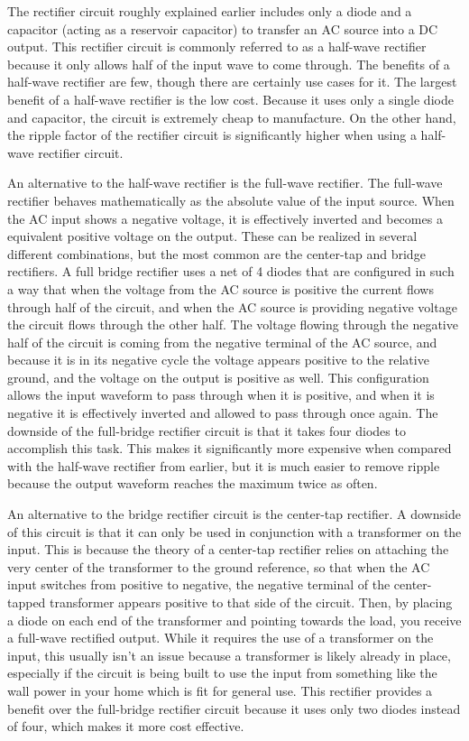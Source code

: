 
The rectifier circuit roughly explained earlier includes
only a diode and a capacitor (acting as a reservoir
capacitor) to transfer an AC source into a DC output.
This rectifier circuit is commonly referred to as a
half-wave rectifier because it only allows half of the
input wave to come through. The benefits of a half-wave
rectifier are few, though there are certainly use cases
for it. The largest benefit of a half-wave rectifier
is the low cost. Because it uses only a single diode
and capacitor, the circuit is extremely cheap to manufacture.
On the other hand, the ripple factor of the rectifier
circuit is significantly higher when using a half-wave
rectifier circuit.

An alternative to the half-wave rectifier is the full-wave
rectifier. The full-wave rectifier behaves mathematically
as the absolute value of the input source. When the
AC input shows a negative voltage, it is effectively
inverted and becomes a equivalent positive voltage on
the output. These can be realized in several different
combinations, but the most common are the center-tap
and bridge rectifiers. A full bridge rectifier uses
a net of 4 diodes that are configured in such a way
that when the voltage from the AC source is positive
the current flows through half of the circuit, and when
the AC source is providing negative voltage the circuit
flows through the other half. The voltage flowing through
the negative half of the circuit is coming from the
negative terminal of the AC source, and because it is
in its negative cycle the voltage appears positive to
the relative ground, and the voltage on the output is
positive as well. This configuration allows the input
waveform to pass through when it is positive, and when
it is negative it is effectively inverted and allowed
to pass through once again. The downside of the full-bridge
rectifier circuit is that it takes four diodes to accomplish
this task. This makes it significantly more expensive
when compared with the half-wave rectifier from earlier,
but it is much easier to remove ripple because the output
waveform reaches the maximum twice as often.

An alternative to the bridge rectifier circuit is the
center-tap rectifier. A downside of this circuit is
that it can only be used in conjunction with a transformer
on the input. This is because the theory of a center-tap
rectifier relies on attaching the very center of the
transformer to the ground reference, so that when the
AC input switches from positive to negative, the negative
terminal of the center-tapped transformer appears positive
to that side of the circuit. Then, by placing a diode
on each end of the transformer and pointing towards
the load, you receive a full-wave rectified output.
While it requires the use of a transformer on the input,
this usually isn't an issue because a transformer is
likely already in place, especially if the circuit is
being built to use the input from something like the
wall power in your home which is fit for general use.
This rectifier provides a benefit over the full-bridge
rectifier circuit because it uses only two diodes instead
of four, which makes it more cost effective.

